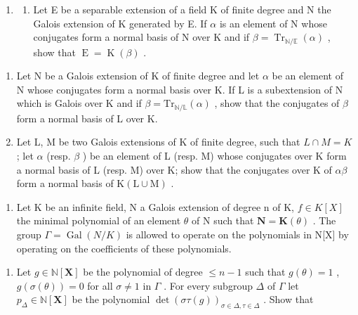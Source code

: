 \begin{enumerate}
\def\labelenumi{\arabic{enumi})}
\setcounter{enumi}{10}
\tightlist
\item
  \begin{enumerate}
  \def\labelenumii{\alph{enumii})}
  \tightlist
  \item
    Let E be a separable extension of a field K of finite degree and N the Galois extension of K generated by E. If \(\alpha\) is an element of N whose conjugates form a normal basis of N over K and if \(\beta = \operatorname{Tr}_{\mathbb{N}/\mathbb{E}}(\alpha)\) , show that \(\operatorname{E} = \operatorname{K}(\beta)\) .
  \end{enumerate}
\end{enumerate}

\begin{enumerate}
\def\labelenumi{\alph{enumi})}
\setcounter{enumi}{1}
\tightlist
\item
  Let N be a Galois extension of K of finite degree and let \(\alpha\) be an element of N whose conjugates form a normal basis over K. If L is a subextension of N which is Galois over K and if \(\beta = \mathrm{Tr}_{\mathbb{N}/\mathbb{L}}(\alpha)\) , show that the conjugates of \(\beta\) form a normal basis of L over K.
\item
  Let L, M be two Galois extensions of K of finite degree, such that \(L \cap M = K\) ; let \(\alpha\) (resp. \(\beta\) ) be an element of L (resp. M) whose conjugates over K form a normal basis of L (resp. M) over K; show that the conjugates over K of \(\alpha\beta\) form a normal basis of \(\mathrm{K}(\mathrm{L} \cup \mathrm{M})\) .
\end{enumerate}

\begin{enumerate}
\def\labelenumi{\arabic{enumi})}
\setcounter{enumi}{11}
\tightlist
\item
  Let K be an infinite field, N a Galois extension of degree n of K, \(f \in K[X]\) the minimal polynomial of an element \(\theta\) of N such that \(\mathbf{N} = \mathbf{K}(\theta)\) . The group \(\Gamma = \operatorname{Gal}(N/K)\) is allowed to operate on the polynomials in N{[}X{]} by operating on the coefficients of these polynomials.
\end{enumerate}

\begin{enumerate}
\def\labelenumi{\alph{enumi})}
\tightlist
\item
  Let \(g \in \mathbb{N}[\mathbf{X}]\) be the polynomial of degree \(\leqslant n - 1\) such that \(g(\theta) = 1\) , \(g(\sigma(\theta)) = 0\) for all \(\sigma \neq 1\) in \(\Gamma\) . For every subgroup \(\Delta\) of \(\Gamma\) let \(p_{\Delta} \in \mathbb{N}[\mathbf{X}]\) be the polynomial \(\det(\sigma\tau(g))_{\sigma \in \Delta, \tau \in \Delta}\) . Show that
\end{enumerate}


